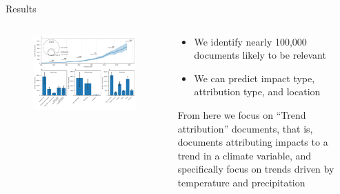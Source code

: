 \documentclass[9pt]{beamer}
\begin{document}
\begin{frame}{Results}

\begin{columns}
	\begin{column}{0.618\linewidth}
		\begin{figure}
			\includegraphics[width=\linewidth]{../figures/figure_1_CFS.png}
		\end{figure}
	\end{column}
	\begin{column}{0.382\linewidth}
		\begin{itemize}
			\item We identify nearly 100,000 documents likely to be relevant
			\item We can predict impact type, attribution type, and location
		\end{itemize}
	
		From here we focus on ``Trend attribution'' documents, that is, documents attributing impacts to a trend in a climate variable, and specifically focus on trends driven by temperature and precipitation
	\end{column}
\end{columns}



\end{frame}

\end{document}
